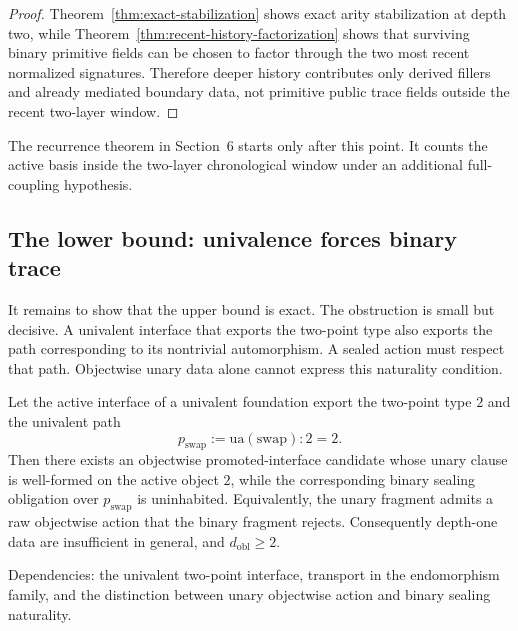 \documentclass{lmcs}
\begin{document}
\begin{proof}
Theorem~\ref{thm:exact-stabilization} shows exact arity stabilization at depth two, while
Theorem~\ref{thm:recent-history-factorization} shows that surviving binary primitive fields
can be chosen to factor through the two most recent normalized signatures.  Therefore deeper
history contributes only derived fillers and already mediated boundary data, not primitive
public trace fields outside the recent two-layer window.
\end{proof}

The recurrence theorem in Section~6 starts only after this point.  It counts the active basis
inside the two-layer chronological window under an additional full-coupling hypothesis.

\subsection{The lower bound: univalence forces binary trace}
\label{subsec:swap-lower-bound}

It remains to show that the upper bound is exact.  The obstruction is small but decisive.
A univalent interface that exports the two-point type also exports the path corresponding to
its nontrivial automorphism.  A sealed action must respect that path.  Objectwise unary data
alone cannot express this naturality condition.

\begin{thm}
\label{thm:swap-obstruction}
Let the active interface of a univalent foundation export the two-point type \(2\) and the
univalent path
\[
  p_{\mathrm{swap}} := \mathrm{ua}(\mathrm{swap}) : 2 = 2.
\]
Then there exists an objectwise promoted-interface candidate whose unary clause is
well-formed on the active object \(2\), while the corresponding binary sealing obligation over
\(p_{\mathrm{swap}}\) is uninhabited.  Equivalently, the unary fragment admits a raw
objectwise action that the binary fragment rejects.  Consequently depth-one data are
insufficient in general, and \(d_{\mathrm{obl}}\geq 2\).

Dependencies: the univalent two-point interface, transport in the endomorphism family, and
the distinction between unary objectwise action and binary sealing naturality.
\end{thm}
\end{document}
